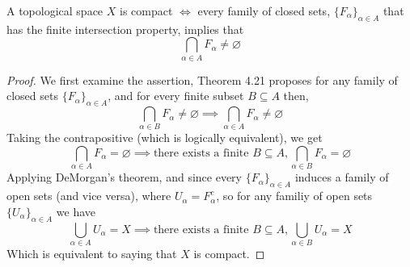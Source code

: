 \documentclass[../../main.tex]{subfiles}
\begin{document}
\begin{wts}
A topological space $X$ is compact $\iff$ every family of closed sets, $\{F_\alpha\}_{\alpha\in A}$ that has the finite intersection property, implies that 
\[
\bigcap_{\alpha\in A}F_\alpha\neq\varnothing
\]
\end{wts}
\newcommand{\fa}{\{F_\alpha\}_{\alpha\in A}}
\newcommand{\ua}{\{U_\alpha\}_{\alpha\in A}}
\begin{proof}
We first examine the assertion, Theorem 4.21 proposes for any family of closed sets $\{F_\alpha\}_{\alpha\in A}$, and for every finite subset $B\subseteq A$ then,
\[
\bigcap_{\alpha\in B} F_\alpha\neq\varnothing\implies\bigcap_{\alpha\in A}F_\alpha\neq\varnothing
\]
Taking the contrapositive (which is logically equivalent), we get
\[
\bigcap_{\alpha\in A}F_\alpha=\varnothing\implies \text{there exists a finite } B\subseteq A, \bigcap_{\alpha\in B}F_\alpha = \varnothing
\]
Applying DeMorgan's theorem, and since every $\fa$ induces a family of open sets (and vice versa), where $U_\alpha=F_\alpha^c$, so for any familiy of open sets $\ua$ we have
\[
\bigcup_{\alpha\in A}U_\alpha = X\implies \text{there exists a finite } B\subseteq A, \bigcup_{\alpha\in B}U_\alpha = X
\]
Which is equivalent to saying that $X$ is compact.
\end{proof}
\end{document}
